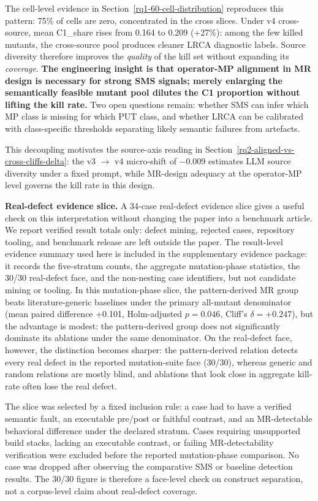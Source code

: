 \documentclass[12pt]{article}
\begin{document}
The cell-level evidence in Section~\ref{rq1-60-cell-distribution} reproduces this pattern: 75\% of cells
are zero, concentrated in the cross slices. Under v4 cross-source, mean
C1\_share rises from 0.164 to 0.209 (+27\%): among the few killed
mutants, the cross-source pool produces cleaner LRCA diagnostic labels.
Source diversity therefore improves the \emph{quality} of the kill set
without expanding its \emph{coverage}. \textbf{The engineering insight is that
operator-MP alignment in MR design is necessary for strong SMS signals;
merely enlarging the semantically feasible mutant pool dilutes the C1
proportion without lifting the kill rate.} Two open questions remain:
whether SMS can infer which MP class is missing for which PUT class, and
whether LRCA can be calibrated with class-specific thresholds separating
likely semantic failures from artefacts.

This decoupling motivates the source-axis reading in Section~\ref{rq2-aligned-vs-cross-cliffs-delta}: the v3 $\to$
v4 micro-shift of −0.009 estimates LLM source diversity under a fixed
prompt, while MR-design adequacy at the operator-MP level governs the
kill rate in this design.

\textbf{Real-defect evidence slice.} A 34-case real-defect evidence
slice gives a useful check on this interpretation without changing the
paper into a benchmark article. We report verified result totals only:
defect mining, rejected cases, repository tooling, and benchmark release
are left outside the paper. The result-level evidence summary used here is included
in the supplementary evidence package: it records the five-stratum counts,
the aggregate mutation-phase statistics, the 30/30 real-defect face, and
the non-nesting case identifiers, but not candidate mining or tooling. In
this mutation-phase slice, the
pattern-derived MR group beats
literature-generic baselines under the primary all-mutant denominator
(mean paired difference +0.101, Holm-adjusted \(p=0.046\), Cliff's
\(\delta=+0.247\)), but the advantage is modest: the pattern-derived
group does not significantly dominate its ablations under the same
denominator. On the real-defect face, however, the distinction becomes
sharper: the pattern-derived relation detects every real defect in the
reported mutation-suite face (30/30), whereas generic and random
relations are mostly blind, and ablations that look close in aggregate
kill-rate often lose the real defect.

The slice was selected by a fixed inclusion rule: a case had to have a
verified semantic fault, an executable pre/post or faithful contrast, and
an MR-detectable behavioral difference under the declared stratum.
Cases requiring unsupported build stacks, lacking an executable contrast,
or failing MR-detectability verification were excluded before the
reported mutation-phase comparison. No case was dropped after observing
the comparative SMS or baseline detection results. The 30/30 figure is
therefore a face-level check on construct separation, not a corpus-level
claim about real-defect coverage.
\end{document}

